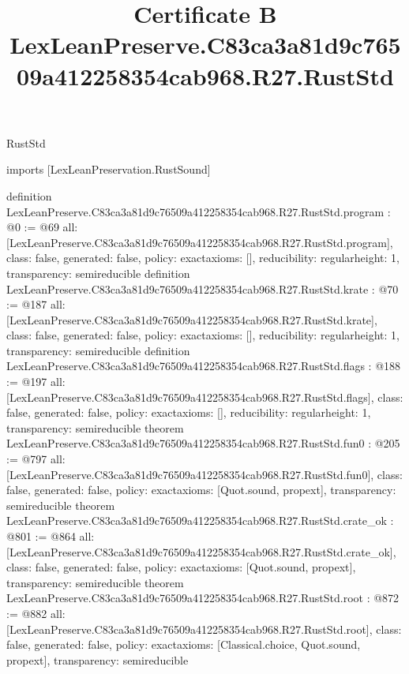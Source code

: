 \begin{lexlean}{RustStd}
\title{Certificate B LexLeanPreserve.C83ca3a81d9c76509a412258354cab968.R27.RustStd}
\begin{coremodule}
imports [LexLeanPreservation.RustSound]

definition LexLeanPreserve.C83ca3a81d9c76509a412258354cab968.R27.RustStd.program : @0 := @69 {
  all: [LexLeanPreserve.C83ca3a81d9c76509a412258354cab968.R27.RustStd.program],
  class: false,
  generated: false,
  policy: exact{axioms: []},
  reducibility: regular{height: 1},
  transparency: semireducible
}
definition LexLeanPreserve.C83ca3a81d9c76509a412258354cab968.R27.RustStd.krate : @70 := @187 {
  all: [LexLeanPreserve.C83ca3a81d9c76509a412258354cab968.R27.RustStd.krate],
  class: false,
  generated: false,
  policy: exact{axioms: []},
  reducibility: regular{height: 1},
  transparency: semireducible
}
definition LexLeanPreserve.C83ca3a81d9c76509a412258354cab968.R27.RustStd.flags : @188 := @197 {
  all: [LexLeanPreserve.C83ca3a81d9c76509a412258354cab968.R27.RustStd.flags],
  class: false,
  generated: false,
  policy: exact{axioms: []},
  reducibility: regular{height: 1},
  transparency: semireducible
}
theorem LexLeanPreserve.C83ca3a81d9c76509a412258354cab968.R27.RustStd.fun0 : @205 := @797 {
  all: [LexLeanPreserve.C83ca3a81d9c76509a412258354cab968.R27.RustStd.fun0],
  class: false,
  generated: false,
  policy: exact{axioms: [Quot.sound, propext]},
  transparency: semireducible
}
theorem LexLeanPreserve.C83ca3a81d9c76509a412258354cab968.R27.RustStd.crate_ok : @801 := @864 {
  all: [LexLeanPreserve.C83ca3a81d9c76509a412258354cab968.R27.RustStd.crate_ok],
  class: false,
  generated: false,
  policy: exact{axioms: [Quot.sound, propext]},
  transparency: semireducible
}
theorem LexLeanPreserve.C83ca3a81d9c76509a412258354cab968.R27.RustStd.root : @872 := @882 {
  all: [LexLeanPreserve.C83ca3a81d9c76509a412258354cab968.R27.RustStd.root],
  class: false,
  generated: false,
  policy: exact{axioms: [Classical.choice, Quot.sound, propext]},
  transparency: semireducible
}


\end{coremodule}
\end{lexlean}
